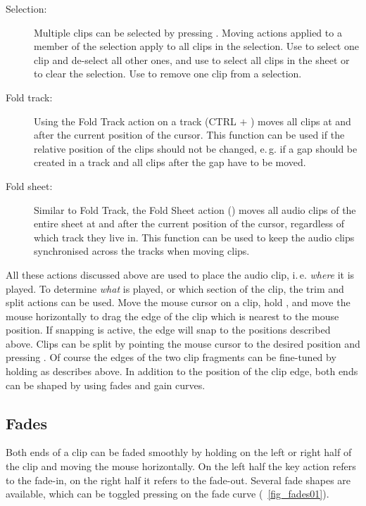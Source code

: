 \begin{description}
  \item[Selection:] Multiple clips can be selected by pressing . Moving actions  applied to a member of the selection apply to all clips in the selection. Use  to select one clip and de-select all other ones, and use  to select all clips in the sheet or to clear the selection. Use  to remove one clip from a selection.
  \item[Fold track:] Using the Fold Track action on a track (CTRL $+$ ) moves all clips at and after the current position of the cursor. This function can be used if the relative position of the clips should not be changed, e.\,g. if a gap should be created in a track and all clips after the gap have to be moved.
  \item[Fold sheet:] Similar to Fold Track, the Fold Sheet action () moves all audio clips of the entire sheet at and after the current position of the cursor, regardless of which track they live in. This function can be used to keep the audio clips synchronised across the tracks when moving clips.
\end{description}

All these actions discussed above are used to place the audio clip, i.\,e. \emph{where} it is played. To determine \emph{what} is played, or which section of the clip, the trim and split actions can be used. Move the mouse cursor on a clip, hold , and move the mouse horizontally to drag the edge of the clip which is nearest to the mouse position. If snapping is active, the edge will snap to the positions described above. Clips can be split by pointing the mouse cursor to the desired position and pressing . Of course the edges of the two clip fragments can be fine-tuned by holding  as describes above. In addition to the position of the clip edge, both ends can be shaped by using fades and gain curves.

\subsection{Fades}
Both ends of a clip can be faded smoothly by holding  on the left or right half of the clip and moving the mouse horizontally. On the left half the key action refers to the fade-in, on the right half it refers to the fade-out. Several fade shapes are available, which can be toggled pressing  on the fade curve (\FigB~\ref{fig_fades01}).

